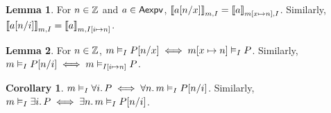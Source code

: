 \documentclass[10pt]{article}
\theoremstyle{definition}
\newtheorem{lemma}{Lemma}
\newtheorem{corollary}{Corollary}[theorem]
\begin{document}
\begin{lemma}
For $n \in \mathbb{Z}$ and $a \in \mathsf{Aexpv}$,
$\EvalI(a[n/x],m,I) = \EvalI(a,m[x \mapsto n],I)$.
Similarly,
$\EvalI(a[n/i],m,I) = \EvalI(a,m,I[i \mapsto n])$.
\end{lemma}

\begin{lemma}
For $n \in \mathbb{Z}$,
$\AVAL m | I |- P[n/x] \iff \AVAL m[x \mapsto n] | I |- P$.
Similarly,
$\AVAL m | I |- P[n/i] \iff \AVAL m | I[i \mapsto n] |- P$.
\end{lemma}

\begin{corollary}
$\AVALmi \forall i.\, P \iff \forall n.\, \AVALmi P[n/i]$.
Similarly,
$\AVALmi \exists i.\, P \iff \exists n.\, \AVALmi P[n/i]$.
\end{corollary}

\iffalse
We define the \emph{interpretation} of $P,Q \in \DomAssert$
to yield the subset of memories
in which the assertion holds:
$\Interp P \triangleq \SetBuild(m | {\Eval(P,m) = \True})$.
Properties of interpretation include (all proven in Coq):
%
\begin{mathpar}
\begin{array}{rcl}
\Interp{\neg P} & = & \complement{\Interp{P}} \\
\Interp{P \wedge Q} & = & \Interp{P} \cap \Interp{Q} \\
\Interp{P \vee Q} & = & \Interp{P} \cup \Interp{Q}
\end{array}
\and
\begin{array}{rcl}
\Interp{P \Rightarrow Q} & = & \complement{\Interp P} \cup \Interp{Q} \\
\Interp{\ETrue} & = & \Mems  \\
\Interp{\EFalse} & = & \emptyset
\end{array}
\end{mathpar}

A boolean expression is \emph{valid},
denoted $\VAL P$,
if $P$ always yields $\True$,
i.e.\ $\Interp P = \Mems$.
Properties include:
{
%
\newcommand*{\LINE}[3]{%
    \VAL #1 & \text{#3} & #2 \\ %
}
%
\begin{mathpar}
{\BIIMP\inferrule*[right=Val-$\wedge$]{
    \VAL P \\ \VAL Q
}{
    \VAL P \wedge Q
}}
%
\and
%
\inferrule*[right=Val-$\vee_\textsc{L}$]{
    \VAL P
}{
    \VAL P \vee Q
}
%
\and
%
\inferrule*[right=Val-$\vee_\textsc{R}$]{
    \VAL Q
}{
    \VAL P \vee Q
}
%
\and
{\BIIMP\inferrule*[right=Val-$\Rightarrow$]{
    \Interp P \subseteq \Interp Q
}{
    \VAL P \Rightarrow Q
}}
\end{mathpar}
}
\fi
\end{document}

